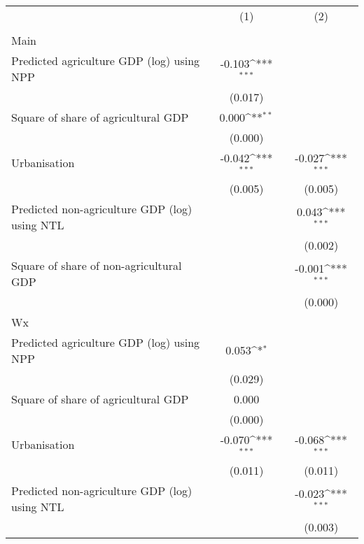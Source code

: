 {
\def\sym#1{\ifmmode^{#1}\else\(^{#1}\)\fi}
\begin{tabular}{l*{2}{c}}
\hline\hline
                    &\multicolumn{1}{c}{(1)}&\multicolumn{1}{c}{(2)}\\
                    &\multicolumn{1}{c}{ }&\multicolumn{1}{c}{ }\\
\hline
Main                &                     &                     \\
Predicted agriculture GDP (log) using NPP&      -0.103\sym{***}&                     \\
                    &     (0.017)         &                     \\
[1em]
Square of share of agricultural GDP&       0.000\sym{**} &                     \\
                    &     (0.000)         &                     \\
[1em]
Urbanisation        &      -0.042\sym{***}&      -0.027\sym{***}\\
                    &     (0.005)         &     (0.005)         \\
[1em]
Predicted non-agriculture GDP (log) using NTL&                     &       0.043\sym{***}\\
                    &                     &     (0.002)         \\
[1em]
Square of share of non-agricultural GDP&                     &      -0.001\sym{***}\\
                    &                     &     (0.000)         \\
\hline
Wx                  &                     &                     \\
Predicted agriculture GDP (log) using NPP&       0.053\sym{*}  &                     \\
                    &     (0.029)         &                     \\
[1em]
Square of share of agricultural GDP&       0.000         &                     \\
                    &     (0.000)         &                     \\
[1em]
Urbanisation        &      -0.070\sym{***}&      -0.068\sym{***}\\
                    &     (0.011)         &     (0.011)         \\
[1em]
Predicted non-agriculture GDP (log) using NTL&                     &      -0.023\sym{***}\\
                    &                     &     (0.003)         \\

\end{tabular}}
